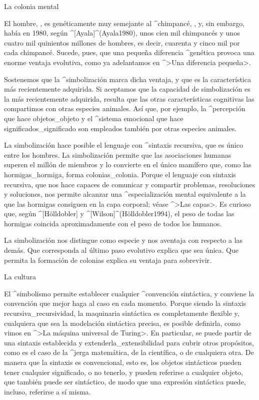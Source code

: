 \Section La colonia mental

El hombre, , es genéticamente muy semejante al
^{chimpancé}, , y, sin embargo, había en 1980,
según ^[Ayala]^(Ayala1980), unos cien mil chimpancés y unos cuatro mil
quinientos millones de hombres, es decir, cuarenta y cinco mil por
cada chimpancé. Sucede, pues, que una pequeña diferencia ^{genética}
provoca una enorme ventaja evolutiva, como ya adelantamos en ^>Una
diferencia pequeña>.

Sostenemos que la ^{simbolización} marca dicha ventaja, y que es la
característica más recientemente adquirida. Si aceptamos que la
capacidad de simbolización es la más recientemente adquirida, resulta
que las otras características cognitivas las compartimos con otras
especies animales. Así que, por ejemplo, la ^{percepción} que hace
objetos_{objeto} y el ^{sistema emocional} que hace
significados_{significado} son empleados también por otras especies
animales.

La simbolización hace posible el lenguaje con ^{sintaxis recursiva}, que
es único entre los hombres. La simbolización permite que las
asociaciones humanas superen el millón de miembros y lo convierte en el
único mamífero que, como las hormigas_{hormiga}, forma
colonias_{colonia}. Porque el lenguaje con sintaxis recursiva, que nos
hace capaces de comunicar y compartir problemas, resoluciones y
soluciones, nos permite alcanzar una ^{especialización} mental
equivalente a la que las hormigas consiguen en la capa corporal; véase
^>Las capas>. Es curioso que, según ^[Hölldobler] y
^[Wilson]^(H\"olldobler1994), el peso de todas las hormigas coincida
aproximadamente con el peso de todos los humanos.

La simbolización nos distingue como especie y nos aventaja con respecto
a las demás. Que corresponda al último paso evolutivo explica que sea
única. Que permita la formación de colonias explica su ventaja para
sobrevivir.


\Section La cultura

El ^{simbolismo} permite establecer cualquier ^{convención} sintáctica,
y conviene la convención que mejor haga al caso en cada momento. Porque
siendo la sintaxis recursiva_{recursividad}, la maquinaria sintáctica es
completamente flexible y, cualquiera que sea la modelación sintáctica
precisa, es posible definirla, como vimos en ^>La máquina universal de
Turing>. En particular, se puede partir de una sintaxis establecida y
extenderla_{extensibilidad} para cubrir otros propósitos, como es el
caso de la ^{jerga} matemática, de la científica, o de cualquiera otra.
De manera que la sintaxis es convencional, esto es, los objetos
sintácticos pueden tener cualquier significado, o no tenerlo, y pueden
referirse a cualquier objeto, que también puede ser sintáctico, de modo
que una expresión sintáctica puede, incluso, referirse a sí misma.

